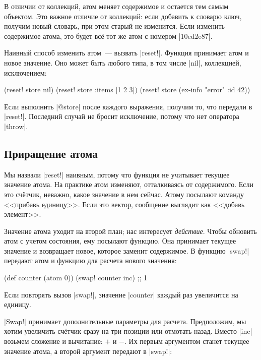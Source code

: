 В отличии от коллекций, атом меняет содержимое и остается тем самым
объектом. Это важное отличие от коллекций: если добавить к словарю ключ, получим
новый словарь, при этом старый не изменится. Если изменить содержимое атома, это
будет вс\"{е} тот же атом с номером \spverb|10ed2e87|.

Наивный способ изменить атом~--- вызвать \spverb|reset!|. Функция принимает атом
и новое значение. Оно может быть любого типа, в том числе \spverb|nil|,
коллекцией, исключением:

\begin{english}
  \begin{clojure}
(reset! store nil)
(reset! store {:items [1 2 3]})
(reset! store (ex-info "error" {:id 42}))
  \end{clojure}
\end{english}

Если выполнить \spverb|@store| после каждого выражения, получим то, что передали
в \spverb|reset!|. Последний случай не бросит исключение, потому что нет
оператора \spverb|throw|.

\subsection{Приращение атома}

Мы назвали \spverb|reset!| наивным, потому что функция не учитывает текущее
значение атома. На практике атом изменяют, отталкиваясь от содержимого. Если это
сч\"{е}тчик, неважно, какое значение в нем сейчас. Атому посылают команду <<прибавь
единицу>>. Если это вектор, сообщение выглядит как <<добавь элемент>>.

Значение атома уходит на второй план; нас интересует \emph{действие}. Чтобы
обновить атом с учетом состояния, ему посылают функцию. Она принимает текущее
значение и возвращает новое, которое заменит содержимое. В функцию
\spverb|swap!| передают атом и функцию для расчета нового значения:

\begin{english}
  \begin{clojure}
(def counter (atom 0))
(swap! counter inc) ;; 1
  \end{clojure}
\end{english}

Если повторять вызов \spverb|swap!|, значение \spverb|counter| каждый раз
увеличится на единицу.

\spverb|Swap!| принимает дополнительные параметры для расчета. Предположим, мы
хотим увеличить сч\"{е}тчик сразу на три позиции или отмотать назад. Вместо
\spverb|inc| возьмем сложение и вычитание: $+$ и $-$. Их первым аргументом
станет текущее значение атома, а второй аргумент передают в \spverb|swap!|:

